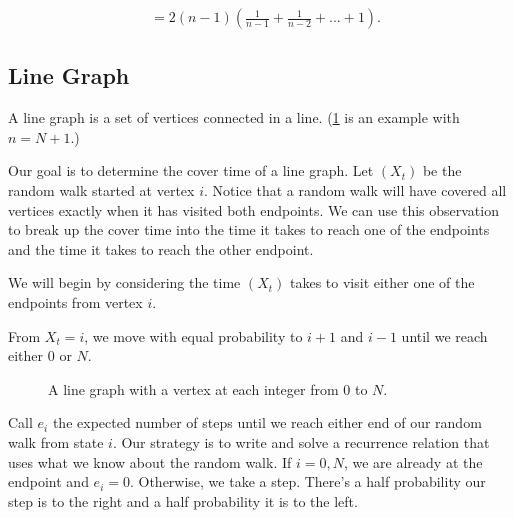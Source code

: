 \documentclass[12pt]{article}
\theoremstyle{definition}
\DeclareMathOperator{\cov}{t_\textrm{cov}}  %
\begin{document}
\begin{align}
\cov&= 2(n-1) \left(\frac{1}{n-1}+\frac{1}{n-2}+...+1\right). \nonumber
\end{align}

\subsection{Line Graph}
A line graph is a set of vertices connected in a line.
(\cref{fig:line} is an example with $n=N+1$.)

Our goal is to determine the cover time of a line graph.
Let $(X_t)$ be the random walk started at vertex $i$.
Notice that a random walk will have covered all vertices
exactly when it has visited both endpoints.
We can use this observation to break up the cover time into the time it takes
to reach one of the endpoints and the time it takes to reach 
the other endpoint.

We will begin by considering the time $(X_t)$ takes to
visit either one of the endpoints from vertex $i$.

From $X_t=i$, we move with equal probability to $i+1$
and $i-1$ until we reach either $0$ or $N$.

\begin{figure}[ht]
	\centering
	\caption{A   line graph with a vertex at each integer from $0$ to $N$.}\label{fig:line}
\end{figure}

Call $e_i$ the expected number of steps until we reach either
end of our random walk from state $i$.
Our strategy is to write and solve a recurrence relation that
uses what we know about the random walk.
If $i=0,N$, we are already at the endpoint and $e_i=0$.
Otherwise, we take a step.
There's a half probability our step is to the right and
a half probability it is to the left.
\end{document}
